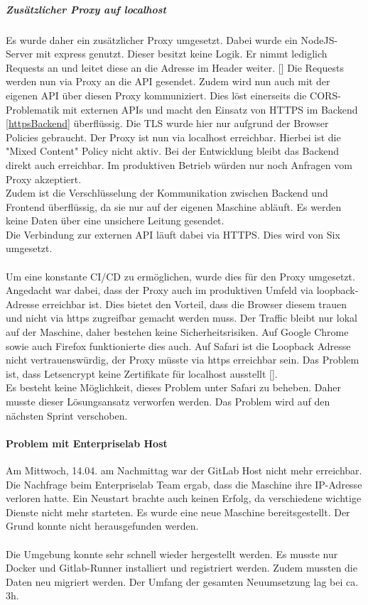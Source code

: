 \subparagraph{Zusätzlicher Proxy auf localhost}
Es wurde daher ein zusätzlicher Proxy umgesetzt. Dabei wurde ein NodeJS-Server mit express genutzt. Dieser besitzt keine Logik. Er nimmt lediglich Requests an und leitet diese an die Adresse im Header weiter. [\cite{corsProxy}] Die Requests werden nun via Proxy an die API gesendet. Zudem wird nun auch mit der eigenen API über diesen Proxy kommuniziert. Dies löst einerseits die \ac{CORS}-Problematik mit externen APIs und macht den Einsatz von HTTPS im Backend \ref{httpsBackend} überflüssig. Die \ac{TLS} wurde hier nur aufgrund der Browser Policies gebraucht. Der Proxy ist nun via localhost erreichbar. Hierbei ist die "Mixed Content" Policy nicht aktiv. Bei der Entwicklung bleibt das Backend direkt auch erreichbar. Im produktiven Betrieb würden nur noch Anfragen vom Proxy akzeptiert. \\
Zudem ist die Verschlüsselung der Kommunikation zwischen Backend und Frontend überflüssig, da sie nur auf der eigenen Maschine abläuft. Es werden keine Daten über eine unsichere Leitung gesendet. \\
Die Verbindung zur externen API läuft dabei via HTTPS. Dies wird von Six umgesetzt.\\\\
Um eine konstante \ac{CI/CD} zu ermöglichen, wurde dies für den Proxy umgesetzt. 
Angedacht war dabei, dass der Proxy auch im produktiven Umfeld via loopback-Adresse erreichbar ist. Dies bietet den Vorteil, dass die Browser diesem trauen und nicht via https zugreifbar gemacht werden muss. Der Traffic bleibt nur lokal auf der Maschine, daher bestehen keine Sicherheitsrisiken. Auf Google Chrome sowie auch Firefox funktionierte dies auch. Auf Safari ist die Loopback Adresse nicht vertrauenswürdig, der Proxy müsste via https erreichbar sein. Das Problem ist, dass Letsencrypt keine Zertifikate für localhost ausstellt [\cite{letsencryptLocalhost}].\\
Es besteht keine Möglichkeit, dieses Problem unter Safari zu beheben. Daher musste dieser Lösungsansatz verworfen werden. Das Problem wird auf den nächsten Sprint verschoben. 


\paragraph{Problem mit Enterpriselab Host}
Am Mittwoch, 14.04. am Nachmittag war der GitLab Host nicht mehr erreichbar. Die Nachfrage beim Enterpriselab Team ergab, dass die Maschine ihre IP-Adresse verloren hatte. Ein Neustart brachte auch keinen Erfolg, da verschiedene wichtige Dienste nicht mehr starteten. Es wurde eine neue Maschine bereitsgestellt. Der Grund konnte nicht herausgefunden werden. \\\\
Die Umgebung konnte sehr schnell wieder hergestellt werden. Es musste nur Docker und Gitlab-Runner installiert und registriert werden. Zudem mussten die Daten neu migriert werden. Der Umfang der gesamten Neuumsetzung lag bei ca. 3h. 

